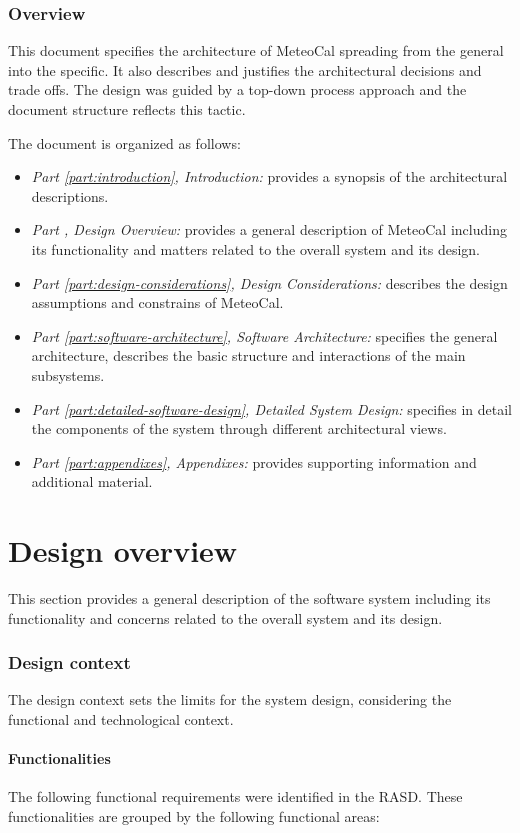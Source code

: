 \documentclass[10pt,a4paper,titlepage]{article}
\begin{document}
\section{Overview}
This document specifies the architecture of MeteoCal spreading from the general into the specific. It also describes and justifies the architectural decisions and trade offs.
The design was guided by a top-down process approach and the document structure reflects this tactic.

The document is organized as follows:
\begin{itemize}
\item \emph{Part \ref{part:introduction}, Introduction:} provides a synopsis of the architectural descriptions.
\item \emph{Part \ref{part:design-overview}, Design Overview:} provides a general description of MeteoCal including its functionality and matters related to the overall system and its design.
\item \emph{Part \ref{part:design-considerations}, Design Considerations:} describes the design assumptions and constrains of MeteoCal.
\item \emph{Part \ref{part:software-architecture}, Software Architecture:} specifies the general architecture, describes the basic structure and interactions of the main subsystems.
\item \emph{Part \ref{part:detailed-software-design}, Detailed System Design:} specifies in detail the components of the system through different architectural views.
\item \emph{Part \ref{part:appendixes}, Appendixes:} provides supporting information and additional material.
\end{itemize}

\clearpage
\part{Design overview}
\label{part:design-overview}
This section provides a general description of the software system including its functionality and concerns related to the overall system and its design.

\section{Design context}
The design context sets the limits for the system design, considering the functional and technological context.

\subsection{Functionalities}
The following functional requirements were identified in the RASD. These functionalities are grouped by the following functional areas:
\end{document}
